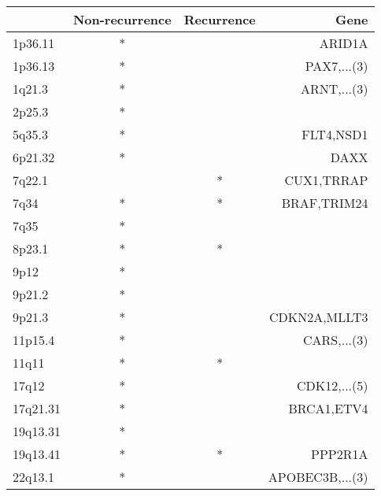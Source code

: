 \begin{tabular}{lccr}
\toprule
{} & Non-recurrence & Recurrence &             Gene \\
\midrule
1p36.11  &              * &            &           ARID1A \\
1p36.13  &              * &            &      PAX7,...(3) \\
1q21.3   &              * &            &      ARNT,...(3) \\
2p25.3   &              * &            &                  \\
5q35.3   &              * &            &        FLT4,NSD1 \\
6p21.32  &              * &            &             DAXX \\
7q22.1   &                &          * &       CUX1,TRRAP \\
7q34     &              * &          * &      BRAF,TRIM24 \\
7q35     &              * &            &                  \\
8p23.1   &              * &          * &                  \\
9p12     &              * &            &                  \\
9p21.2   &              * &            &                  \\
9p21.3   &              * &            &     CDKN2A,MLLT3 \\
11p15.4  &              * &            &      CARS,...(3) \\
11q11    &              * &          * &                  \\
17q12    &              * &            &     CDK12,...(5) \\
17q21.31 &              * &            &       BRCA1,ETV4 \\
19q13.31 &              * &            &                  \\
19q13.41 &              * &          * &          PPP2R1A \\
22q13.1  &              * &            &  APOBEC3B,...(3) \\
\bottomrule
\end{tabular}
